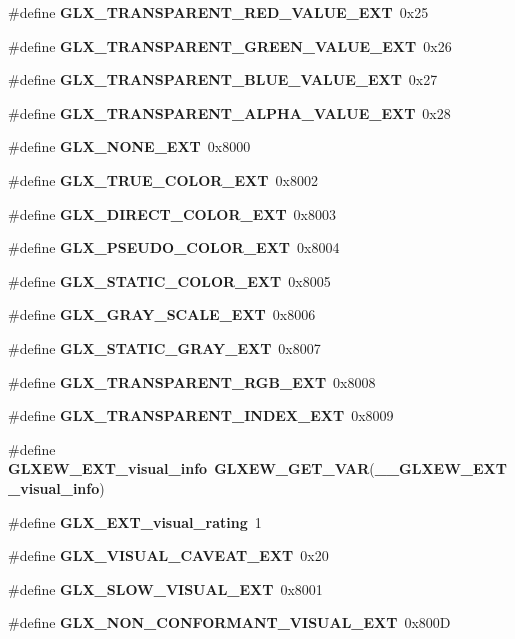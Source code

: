 \begin{DoxyCompactItemize}
\item 
\#define {\bf G\+L\+X\+\_\+\+T\+R\+A\+N\+S\+P\+A\+R\+E\+N\+T\+\_\+\+R\+E\+D\+\_\+\+V\+A\+L\+U\+E\+\_\+\+E\+XT}~0x25
\item 
\#define {\bf G\+L\+X\+\_\+\+T\+R\+A\+N\+S\+P\+A\+R\+E\+N\+T\+\_\+\+G\+R\+E\+E\+N\+\_\+\+V\+A\+L\+U\+E\+\_\+\+E\+XT}~0x26
\item 
\#define {\bf G\+L\+X\+\_\+\+T\+R\+A\+N\+S\+P\+A\+R\+E\+N\+T\+\_\+\+B\+L\+U\+E\+\_\+\+V\+A\+L\+U\+E\+\_\+\+E\+XT}~0x27
\item 
\#define {\bf G\+L\+X\+\_\+\+T\+R\+A\+N\+S\+P\+A\+R\+E\+N\+T\+\_\+\+A\+L\+P\+H\+A\+\_\+\+V\+A\+L\+U\+E\+\_\+\+E\+XT}~0x28
\item 
\#define {\bf G\+L\+X\+\_\+\+N\+O\+N\+E\+\_\+\+E\+XT}~0x8000
\item 
\#define {\bf G\+L\+X\+\_\+\+T\+R\+U\+E\+\_\+\+C\+O\+L\+O\+R\+\_\+\+E\+XT}~0x8002
\item 
\#define {\bf G\+L\+X\+\_\+\+D\+I\+R\+E\+C\+T\+\_\+\+C\+O\+L\+O\+R\+\_\+\+E\+XT}~0x8003
\item 
\#define {\bf G\+L\+X\+\_\+\+P\+S\+E\+U\+D\+O\+\_\+\+C\+O\+L\+O\+R\+\_\+\+E\+XT}~0x8004
\item 
\#define {\bf G\+L\+X\+\_\+\+S\+T\+A\+T\+I\+C\+\_\+\+C\+O\+L\+O\+R\+\_\+\+E\+XT}~0x8005
\item 
\#define {\bf G\+L\+X\+\_\+\+G\+R\+A\+Y\+\_\+\+S\+C\+A\+L\+E\+\_\+\+E\+XT}~0x8006
\item 
\#define {\bf G\+L\+X\+\_\+\+S\+T\+A\+T\+I\+C\+\_\+\+G\+R\+A\+Y\+\_\+\+E\+XT}~0x8007
\item 
\#define {\bf G\+L\+X\+\_\+\+T\+R\+A\+N\+S\+P\+A\+R\+E\+N\+T\+\_\+\+R\+G\+B\+\_\+\+E\+XT}~0x8008
\item 
\#define {\bf G\+L\+X\+\_\+\+T\+R\+A\+N\+S\+P\+A\+R\+E\+N\+T\+\_\+\+I\+N\+D\+E\+X\+\_\+\+E\+XT}~0x8009
\item 
\#define {\bf G\+L\+X\+E\+W\+\_\+\+E\+X\+T\+\_\+visual\+\_\+info}~{\bf G\+L\+X\+E\+W\+\_\+\+G\+E\+T\+\_\+\+V\+AR}({\bf \+\_\+\+\_\+\+G\+L\+X\+E\+W\+\_\+\+E\+X\+T\+\_\+visual\+\_\+info})
\item 
\#define {\bf G\+L\+X\+\_\+\+E\+X\+T\+\_\+visual\+\_\+rating}~1
\item 
\#define {\bf G\+L\+X\+\_\+\+V\+I\+S\+U\+A\+L\+\_\+\+C\+A\+V\+E\+A\+T\+\_\+\+E\+XT}~0x20
\item 
\#define {\bf G\+L\+X\+\_\+\+S\+L\+O\+W\+\_\+\+V\+I\+S\+U\+A\+L\+\_\+\+E\+XT}~0x8001
\item 
\#define {\bf G\+L\+X\+\_\+\+N\+O\+N\+\_\+\+C\+O\+N\+F\+O\+R\+M\+A\+N\+T\+\_\+\+V\+I\+S\+U\+A\+L\+\_\+\+E\+XT}~0x800D

\end{DoxyCompactItemize}

